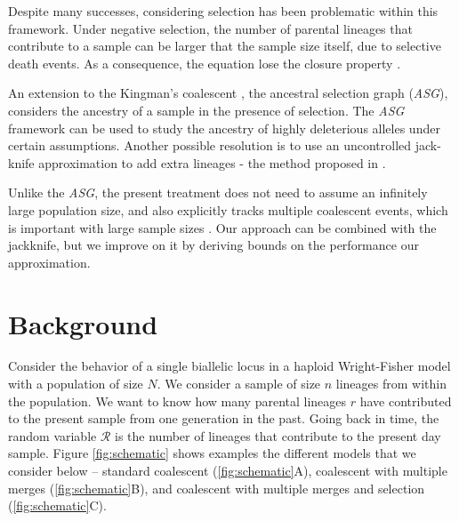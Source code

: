 \documentclass[review]{elsarticle}
\begin{document}
Despite many successes, considering selection has been problematic within this framework. Under
negative selection, the number of parental lineages that contribute to a sample can be larger that
the sample size itself, due to selective death events. As a consequence, the equation lose the
closure property \cite{JouganousEtAl2017}.

An extension to the Kingman's coalescent \cite{Kingman1982a}, the ancestral selection graph
(\textit{ASG}), \cite{KroneNeuhauser1997} considers the ancestry of a sample in the presence of
selection. The \textit{ASG} framework can be used to study the ancestry of highly deleterious
alleles \cite{Wakeley2009} under certain assumptions. Another possible resolution is to use an
uncontrolled jack-knife approximation to add extra lineages - the method proposed in
\cite{JouganousEtAl2017}.

Unlike the \textit{ASG}, the present treatment does not need to assume an infinitely large
population size, and also explicitly tracks multiple coalescent events, which is important with
large sample sizes \cite{BhaskarEtAl2014}. Our approach can be combined with the jackknife, but we
improve on it by deriving bounds on the performance our approximation.

\section{Background}
\label{sec:background}

Consider the behavior of a single biallelic locus in a haploid Wright-Fisher model with a population
of size $N$. We consider a sample of size $n$ lineages from within the population. We want to know
how many parental lineages $r$ have contributed to the present sample from one generation in the
past. Going back in time, the random variable $\mathcal{R}$ is the number of lineages that
contribute to the present day sample. Figure \ref{fig:schematic} shows examples the different models
that we consider below -- standard coalescent (\ref{fig:schematic}A), coalescent with multiple
merges (\ref{fig:schematic}B), and coalescent with multiple merges and selection
(\ref{fig:schematic}C).
\end{document}
